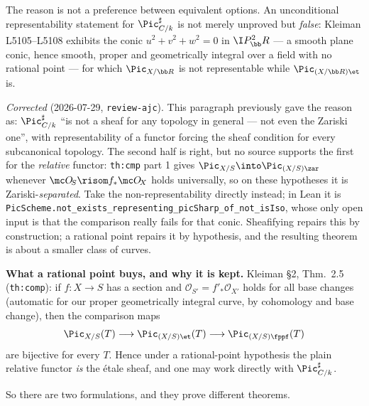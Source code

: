 The reason is not a preference between equivalent options. An unconditional
representability statement for \(\Pic^\sharp_{C/k}\) is not merely unproved but
\emph{false}: Kleiman L5105--L5108 exhibits the conic \(u^2+v^2+w^2=0\) in
\(\I P^2_\bb R\) --- a smooth plane conic, hence smooth, proper and geometrically
integral over a field with no rational point --- for which \(\Pic_{X/\bb R}\) is
not representable while \(\Pic_{(X/\bb R)\et}\) is.

\emph{Corrected} (2026-07-29, \texttt{review-ajc}). This paragraph previously gave
the reason as: \(\Pic^\sharp_{C/k}\) ``is not a sheaf for any topology in general
--- not even the Zariski one'', with representability of a functor forcing the
sheaf condition for every subcanonical topology. The second half is right, but no
source supports the first for the \emph{relative} functor: \texttt{th:cmp} part 1
gives \(\Pic_{X/S}\into\Pic_{(X/S)\zar}\) whenever
\(\mc O_{\!S}\risom f_*\mc O_{\!X}\) holds universally, so on these hypotheses it
is Zariski-\emph{separated}. Take the non-representability directly instead; in
Lean it is
\texttt{PicScheme.not\_exists\_representing\_picSharp\_of\_not\_isIso}, whose only
open input is that the comparison really fails for that conic. Sheafifying repairs this by construction; a rational point repairs
it by hypothesis, and the resulting theorem is about a smaller class of curves.

\medskip

\textbf{What a rational point buys, and why it is kept.} Kleiman \S 2, Thm.~2.5
(\texttt{th:comp}): if \(f : X \to S\) has a section
and \(\mathcal O_{S'} = f'_* \mathcal O_{X'}\) holds for all base changes
(automatic for our proper geometrically integral curve, by cohomology and
base change), then the comparison maps
\[
  \Pic_{X/S}(T) \longrightarrow \Pic_{(X/S)\et}(T) \longrightarrow
  \Pic_{(X/S)\fppf}(T)
\]
are bijective for every \(T\). Hence under a rational-point hypothesis the
plain relative functor \emph{is} the \'etale sheaf, and one may work directly
with \(\Pic^\sharp_{C/k}\).

So there are two formulations, and they prove different theorems.

